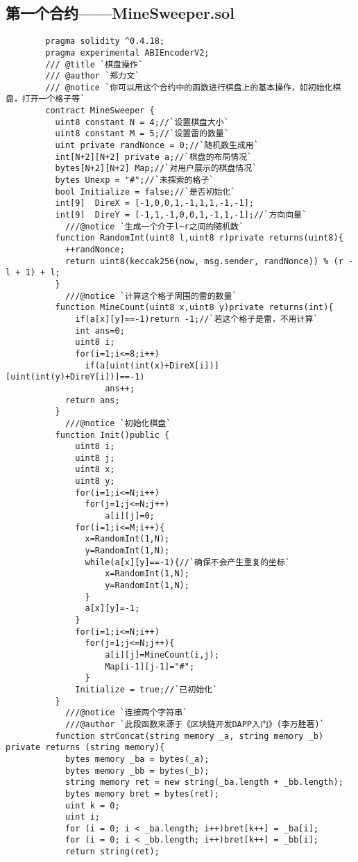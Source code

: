 \documentclass[UTF8]{ctexart}
\begin{document}
	\subsection{第一个合约——MineSweeper.sol}
	\begin{lstlisting}
		pragma solidity ^0.4.18;
		pragma experimental ABIEncoderV2;
		/// @title `棋盘操作`
		/// @author `郑力文`
		/// @notice `你可以用这个合约中的函数进行棋盘上的基本操作，如初始化棋盘，打开一个格子等`
		contract MineSweeper {
		  uint8 constant N = 4;//`设置棋盘大小`
		  uint8 constant M = 5;//`设置雷的数量`
		  uint private randNonce = 0;//`随机数生成用`
		  int[N+2][N+2] private a;//`棋盘的布局情况`
		  bytes[N+2][N+2] Map;//`对用户展示的棋盘情况`
		  bytes Unexp = "#";//`未探索的格子`
		  bool Initialize = false;//`是否初始化`
		  int[9]  DireX = [-1,0,0,1,-1,1,1,-1,-1];
		  int[9]  DireY = [-1,1,-1,0,0,1,-1,1,-1];//`方向向量`
			///@notice `生成一个介于l~r之间的随机数`
		  function RandomInt(uint8 l,uint8 r)private returns(uint8){
		    ++randNonce;
		    return uint8(keccak256(now, msg.sender, randNonce)) % (r - l + 1) + l;
		  }
			///@notice `计算这个格子周围的雷的数量`
		  function MineCount(uint8 x,uint8 y)private returns(int){
		      if(a[x][y]==-1)return -1;//`若这个格子是雷，不用计算`
		      int ans=0;
		      uint8 i;
		      for(i=1;i<=8;i++)
		        if(a[uint(int(x)+DireX[i])][uint(int(y)+DireY[i])]==-1)
		            ans++;
		    return ans;
		  }
			///@notice `初始化棋盘`
		  function Init()public {
		      uint8 i;
		      uint8 j;
		      uint8 x;
		      uint8 y;
		      for(i=1;i<=N;i++)
		        for(j=1;j<=N;j++)
		            a[i][j]=0;
		      for(i=1;i<=M;i++){
		        x=RandomInt(1,N);
		        y=RandomInt(1,N);
		        while(a[x][y]==-1){//`确保不会产生重复的坐标`
		            x=RandomInt(1,N);
		            y=RandomInt(1,N);
		        }
		        a[x][y]=-1;
		      }
		      for(i=1;i<=N;i++)
		        for(j=1;j<=N;j++){
		            a[i][j]=MineCount(i,j);
		            Map[i-1][j-1]="#";
		        }
		      Initialize = true;//`已初始化`
		  }
			///@notice `连接两个字符串`
			///@author `此段函数来源于《区块链开发DAPP入门》(李万胜著)`
		  function strConcat(string memory _a, string memory _b) private returns (string memory){
		    bytes memory _ba = bytes(_a);
		    bytes memory _bb = bytes(_b);
		    string memory ret = new string(_ba.length + _bb.length);
		    bytes memory bret = bytes(ret);
		    uint k = 0;
		    uint i;
		    for (i = 0; i < _ba.length; i++)bret[k++] = _ba[i];
		    for (i = 0; i < _bb.length; i++)bret[k++] = _bb[i];
		    return string(ret);

\end{lstlisting}
\end{document}
